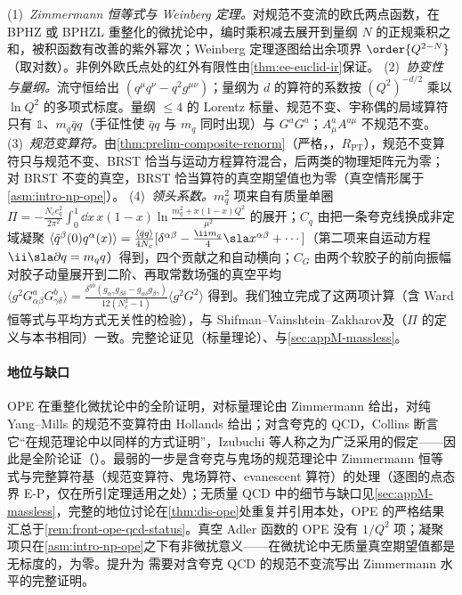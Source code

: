 \begin{proofsketch}
(1)~\emph{Zimmermann 恒等式与 Weinberg 定理。}对规范不变流的欧氏两点函数，在 BPHZ 或 BPHZL 重整化的微扰论中，编时乘积减去展开到量纲 $N$ 的正规乘积之和，被积函数有改善的紫外幂次；Weinberg 定理逐图给出余项界 $\order{Q^{2-N}}$（取对数）。非例外欧氏点处的红外有限性由\cref{thm:ee-euclid-ir}保证。
(2)~\emph{协变性与量纲。}流守恒给出 $(q^\mu q^\nu-q^2g^{\mu\nu})$；量纲为 $d$ 的算符的系数按 $(Q^2)^{-d/2}$ 乘以 $\ln Q^2$ 的多项式标度。量纲 $\le4$ 的 Lorentz 标量、规范不变、宇称偶的局域算符只有 $\mathbb 1$、$m_q\bar qq$（手征性使 $\bar qq$ 与 $m_q$ 同时出现）与 $G^aG^a$；$A^a_\mu A^{a\mu}$ 不规范不变。
(3)~\emph{规范变算符。}由\cref{thm:prelim-composite-renorm}（严格，\tagR，$R_{\mathrm{PT}}$），规范不变算符只与规范不变、BRST 恰当与运动方程算符混合，后两类的物理矩阵元为零；对 BRST 不变的真空，BRST 恰当算符的真空期望值也为零（真空情形属于\cref{asm:intro-np-ope}）。
(4)~\emph{领头系数。}$m_q^2$ 项来自有质量单圈 $\Pi=-\frac{N_ce_q^2}{2\pi^2}\int_0^1\dd x\,x(1-x)\ln\frac{m_q^2+x(1-x)Q^2}{\mu^2}$ 的展开；$C_q$ 由把一条夸克线换成非定域凝聚 $\langle\bar q^\beta(0)q^\alpha(x)\rangle=\frac{\langle\bar qq\rangle}{4N_c}[\delta^{\alpha\beta}-\frac{\ii m_q}4\sla x^{\alpha\beta}+\cdots]$（第二项来自运动方程 $\ii\sla\partial q=m_qq$）得到，四个贡献之和自动横向；$C_G$ 由两个软胶子的前向振幅对胶子动量展开到二阶、再取常数场强的真空平均 $\langle g^2G^a_{\alpha\beta}G^b_{\gamma\delta}\rangle=\frac{\delta^{ab}(g_{\alpha\gamma}g_{\beta\delta}-g_{\alpha\delta}g_{\beta\gamma})}{12(N_c^2-1)}\langle g^2G^2\rangle$ 得到。我们独立完成了这两项计算（含 Ward 恒等式与平均方式无关性的检验），与 Shifman--Vainshtein--Zakharov\cite{ShifmanVainshteinZakharov1979a,ShifmanVainshteinZakharov1979b}及\cite[式~(45)]{Colangelo:2000dp}（$\Pi$ 的定义与本书相同）一致。完整论证见\cite{Zimmermann1973}（标量理论）、\cite[第~12.8~节]{Collins1984}与\cref{sec:appM-massless}。
\end{proofsketch}

\paragraph{地位与缺口}OPE 在重整化微扰论中的全阶证明，对标量理论由 Zimmermann 给出\cite{Zimmermann1973}，对纯 Yang--Mills 的规范不变算符由 Hollands 给出\cite{Hollands:2007zg}；对含夸克的 QCD，Collins 断言它“在规范理论中以同样的方式证明”\cite[第~12.8~节]{Collins1984}，Izubuchi 等人称之为广泛采用的假定\cite[第~II~节]{IzubuchiEtAl2018}——因此是全阶论证（\tagA）。最弱的一步是含夸克与鬼场的规范理论中 Zimmermann 恒等式与完整算符基（规范变算符、鬼场算符、evanescent 算符）的处理（逐图的点态界 E-P，仅在所引定理适用之处）；无质量 QCD 中的细节与缺口见\cref{sec:appM-massless}，完整的地位讨论在\cref{thm:dis-ope}处重复并引用本处，OPE 的严格结果汇总于\cref{rem:front-ope-qcd-status}。真空 Adler 函数的 OPE 没有 $1/Q^2$ 项；凝聚项只在\cref{asm:intro-np-ope}之下有非微扰意义——在微扰论中无质量真空期望值都是无标度的，为零。提升为 \tagR 需要对含夸克 QCD 的规范不变流写出 Zimmermann 水平的完整证明。

